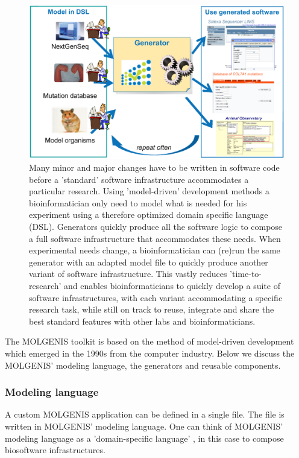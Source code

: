 \begin{figure}[h!]
  \centering
  \includegraphics[width=1.0\textwidth]{eps/image_5_1.eps}
  \caption[MOLGENIS]
    {Many minor and major changes have to be written in software code before a 'standard' software infrastructure 
    accommodates a particular research. Using 'model-driven' development methods a bioinformatician only need to 
    model what is needed for his experiment using a therefore optimized domain specific language (DSL). Generators 
    quickly produce all the software logic to compose a full software infrastructure that accommodates these needs. 
    When experimental needs change, a bioinformatician can (re)run the same generator with an adapted model file 
    to quickly produce another variant of software infrastructure. This vastly reduces 'time-to-research' and 
    enables bioinformaticians to quickly develop a suite of software infrastructures, with each variant accommodating 
    a specific research task, while still on track to reuse, integrate and share the best standard features with 
    other labs and bioinformaticians.}
    \label{fig:modelDrivenDevelopment}
\end{figure}

The MOLGENIS toolkit is based on the method of model-driven development which emerged in the 1990s 
from the computer industry. Below we discuss the MOLGENIS' modeling language, the generators and 
reusable components. 

\subsubsection{Modeling language}
A custom MOLGENIS application can be defined in a single file. The file is written in MOLGENIS' 
modeling language. One can think of MOLGENIS' modeling language as a 'domain-specific language' 
\cite{Deursen:2002}, in this case to compose biosoftware infrastructures.


